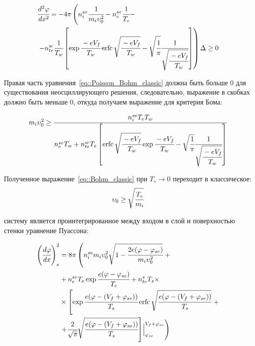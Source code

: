\begin{equation}
	\begin{split}
	&\cfrac{d^2\varphi}{dx^2} = -4\pi\left(n_i^{se}\cfrac{1}{m_i\upsilon_0^2} - n_e^{se}\cfrac{1}{T_e} - \right. 
		\\ &\left. - n_{te}^w\cfrac{1}{T_w}\left[\exp{\cfrac{-eV_f}{T_w}}\operatorname{erfc}{\sqrt{\cfrac{-eV_f}{T_w}}} - \sqrt{\cfrac{1}{\pi}}\cfrac{1}{\sqrt{\cfrac{-eV_f}{T_w}}}\right]\right)\Delta \ge 0
	\end{split}
    \label{eq::Poisson_Bohm_classic}
\end{equation}

Правая часть уравнения~\eqref{eq::Poisson_Bohm_classic} должна быть больше 0 для существования неосциллирующего решения, следовательно,
выражение в скобках должно быть меньше 0, откуда получаем выражение для критерия Бома:

\begin{equation}
	m_i\upsilon_0^2 \ge \cfrac{n_i^{se}T_eT_w}{n_e^{se}T_w + n_{te}^wT_e\left[\operatorname{erfc}{\sqrt{\cfrac{-eV_f}{T_w}}}\exp{\cfrac{-eV_f}{T_w}} - \sqrt{\cfrac{1}{\pi}}\cfrac{1}{\sqrt{\cfrac{-eV_f}{T_w}}}\right]}
	\label{eq::Bohm_classic}
\end{equation}

Полученное выражение~\eqref{eq::Bohm_classic} при $T_s\rightarrow0$ переходит в классическое\cite{stangeby2000plasma}:
\begin{equation}
    \upsilon_0 \ge \sqrt{\cfrac{T_e}{m_i}}
	\label{eq::canonical::Bohm_classic}
\end{equation}

 систему является проинтегрированное между входом в слой и поверхностью стенки уравнение Пуассона:

\begin{equation}
	\begin{split}
        \left(\cfrac{d\varphi}{dx}\right)^2_s &= 8\pi\left(n_i^{se}m_i\upsilon_0^2\sqrt{1 - \cfrac{2e(\varphi-\varphi_{se})}{m_i\upsilon_0^2}}\right. + 
	   \\ &+ n_e^{se}T_e\exp{\cfrac{e(\varphi-\varphi_{se})}{T_e}} + n_{te}^sT_s \times
	\\ & \times \left[\exp{\cfrac{e(\varphi - (V_f + \varphi_{se}))}{T_s}}\operatorname{erfc}{\sqrt{\cfrac{e(\varphi - (V_f + \varphi_{se}))}{T_s}}} \right.+
	\\ &\left. + \cfrac{2}{\sqrt{\pi}}\sqrt{\cfrac{e(\varphi - (V_f + \varphi_{se}))}{T_s}}\right]\Bigr|_{\varphi_{se}}^{V_f + \varphi_{se}}\Bigg)
	\end{split}
    \label{eq::Poisson_classic_wall}
\end{equation}

